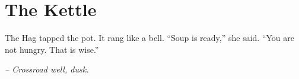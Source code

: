 \chapter*{The Kettle}

The Hag tapped the pot. It rang like a bell. ``Soup is ready,'' she said. ``You are not hungry. That is wise.''

\smallskip

\noindent \textit{-- Crossroad well, dusk.}
